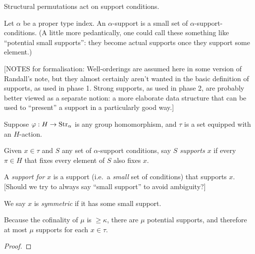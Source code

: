 \begin{definition}
\label{def:support-condition-action}
\leanok
Structural permutations act on support conditions.
\end{definition}

\begin{definition}
\label{def:support}
\leanok
Let $\alpha$ be a proper type index. An $\alpha$-support is a small set of $\alpha$-support-conditions.  (A little more pedantically, one could call these something like “potential small supports”: they become actual supports once they support some element.)

[NOTES for formalisation: Well-orderings are assumed here in some version of Randall’s note, but they almost certainly aren’t wanted in the basic definition of supports, as used in phase 1. Strong supports, as used in phase 2, are probably better viewed as a separate notion: a more elaborate data structure that can be used to “present” a support in a particularly good way.]
\end{definition}

\begin{definition}
\label{def:support-of}
  \leanok
  Suppose $\varphi : H \to \mathrm{Str}_\alpha$ is any group homomorphism, and $\tau$ is a set equipped with an $H$-action.

  Given $x \in \tau$ and $S$ any set of $\alpha$-support conditions, say \emph{$S$ supports $x$} if every $\pi \in H$ that fixes every element of $S$ also fixes $x$.

  A \emph{support for $x$} is a support (i.e.\ a \emph{small} set of conditions) that supports $x$. [Should we try to always say “small support” to avoid ambiguity?]

  We say $x$ is \emph{symmetric} if it has some small support.
\end{definition}

\begin{lemma}
  \label{lem:count-supports}
  \leanok
  Because the cofinality of $\mu$ is $\geq \kappa$, there are $\mu$ potential supports, and therefore at most $\mu$ supports for each $x \in \tau$.
\end{lemma}
\begin{proof}
  \leanok
\end{proof}

